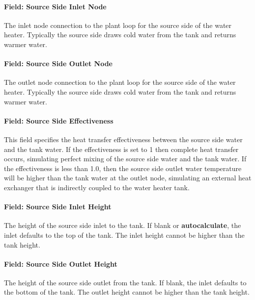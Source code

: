 \paragraph{Field: Source Side Inlet Node}\label{field-source-side-inlet-node}

The inlet node connection to the plant loop for the source side of the water heater. Typically the source side draws cold water from the tank and returns warmer water.

\paragraph{Field: Source Side Outlet Node}\label{field-source-side-outlet-node}

The outlet node connection to the plant loop for the source side of the water heater. Typically the source side draws cold water from the tank and returns warmer water.

\paragraph{Field: Source Side Effectiveness}\label{field-source-side-effectiveness-1}

This field specifies the heat transfer effectiveness between the source side water and the tank water. If the effectiveness is set to 1 then complete heat transfer occurs, simulating perfect mixing of the source side water and the tank water. If the effectiveness is less than 1.0, then the source side outlet water temperature will be higher than the tank water at the outlet node, simulating an external heat exchanger that is indirectly coupled to the water heater tank.

\paragraph{Field: Source Side Inlet Height}\label{field-source-side-inlet-height-000}

The height of the source side inlet to the tank. If blank or \textbf{autocalculate}, the inlet defaults to the top of the tank. The inlet height cannot be higher than the tank height.

\paragraph{Field: Source Side Outlet Height}\label{field-source-side-outlet-height-000}

The height of the source side outlet from the tank. If blank, the inlet defaults to the bottom of the tank. The outlet height cannot be higher than the tank height.

